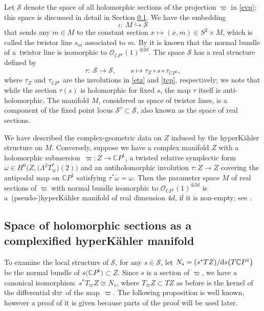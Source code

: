 \documentclass[pdftex]{sigma}
\numberwithin{equation}{section}
\theoremstyle{definition}
\newcommand\C{{\mathbb C}}
\begin{document}
Let $\mathcal{S}$ denote the space of all holomorphic sections of
the projection $\varpi$ in \eqref{evp}; this space is discussed in detail in Section \ref{ss:HolSects}.
We have the embedding
\begin{equation}\label{te}
\iota \colon \ M \hookrightarrow \mathcal{S}
\end{equation}
that sends any $m \in M$ to the constant section $x \longmapsto (x, m) \in S^2\times M$,
which is called the twistor line $s_m$ associated to $m$.
By \cite[Section~3, (F)]{HKLR} it is known that the normal bundle of a~twistor line is isomorphic to $\mathcal{O}_{\C P^1}(1)^{\oplus 2d}$.
The space $\mathcal{S}$ has a real structure defined by
\begin{equation}\label{tau}
\tau \colon \ \mathcal{S} \longrightarrow \mathcal{S}, \qquad s \longmapsto \tau_Z\circ s\circ\tau_{\C P^1} ,
\end{equation}
where $\tau_Z$ and $\tau_{\C P^1}$ are the involutions in \eqref{etz} and \eqref{tcp},
respectively; we note that while the section $\tau(s)$ is holomorphic for fixed $s$, the map
$\tau$ itself is anti-holomorphic. The manifold $M$, considered as space of twistor lines, is a component of the
fixed point locus $\mathcal{S}^\tau \subset \mathcal{S}$, also known as the space of real sections.

We have described the complex-geometric data on $Z$ induced by the hyperK\"ahler structure on $M$. Conversely,
suppose we have a complex manifold $Z$ with a holomorphic submersion~${\varpi\colon Z
\longrightarrow \C P^1}$, a twisted relative
symplectic form~${\omega\in H^0\bigl(Z, \bigl(\Lambda^2T^*_\varpi\bigr)(2)\bigr)}$ and an antiholomorphic involution $\tau\colon Z
 \longrightarrow Z$
covering the antipodal map on $\C P^1$ satisfying $\tau^*\overline{\omega} = \omega$. Then the parameter space $M$ of real
sections of $\varpi$ with normal bundle isomorphic to $\mathcal{O}_{\C P^1}(1)^{\oplus 2d}$ is a~(pseudo-)hyperK\"ahler
manifold of real dimension $4d$, if it is non-empty; see \cite[Theorem 3.3]{HKLR}.

\subsection{Space of holomorphic sections as a complexified hyperK\"ahler manifold}\label{ss:HolSects}

To examine the local structure of $\mathcal{S}$, for any $s \in {\mathcal S}$, let
$N_s = (s^*TZ) / {\rm d}s\bigl(T\C P^1\bigr)$
be the normal bundle
of $s\bigl(\C P^1\bigr) \subset Z$. Since $s$ is a section of $\varpi$, we have a canonical isomorphism~${
s^*T_\varpi Z \cong N_s }$,
where $T_\varpi Z \subset TZ$ as before is the kernel of the differential ${\rm d}\varpi$ of the map~$\varpi$. The
following proposition is well known, however a proof of it is given because parts of the proof will be
used later.
\end{document}
